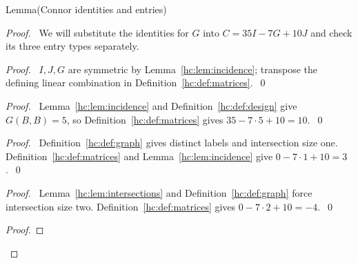 \begin{mergedproofsection}
\begin{namedresult}{Lemma}{(Connor identities and entries)}\label{hc:lem:Connor}
 \leavevmode\par
\end{namedresult}
\begin{proof}
 \pfsketch\ We will substitute the identities for $G$ into
 $C=35I-7G+10J$ and check its three entry types separately.
 \begin{proof}\pf\ $I,J,G$ are symmetric by
  Lemma~\ref{hc:lem:incidence}; transpose the defining linear
  combination in Definition~\ref{hc:def:matrices}.~\qed\end{proof}
 \begin{proof}\pf\ Lemma~\ref{hc:lem:incidence} and
  Definition~\ref{hc:def:design} give $G(B,B)=5$, so
  Definition~\ref{hc:def:matrices} gives $35-7\cdot5+10=10$.~\qed\end{proof}
 \begin{proof}\pf\ Definition~\ref{hc:def:graph} gives distinct
  labels and intersection size one. Definition~\ref{hc:def:matrices}
  and Lemma~\ref{hc:lem:incidence} give $0-7\cdot1+10=3$.~\qed\end{proof}
 \begin{proof}\pf\ Lemma~\ref{hc:lem:intersections} and
  Definition~\ref{hc:def:graph} force intersection size two.
  Definition~\ref{hc:def:matrices} gives $0-7\cdot2+10=-4$.~\qed\end{proof}
 \begin{proof}

\end{proof}
\end{proof}
\end{mergedproofsection}
